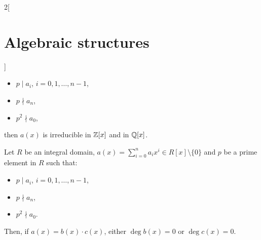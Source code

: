 \documentclass[../../../main_math.tex]{subfiles}
\begin{document}
\begin{multicols}{2}[\section{Algebraic structures}]
\begin{theorem}
    \begin{itemize}
      \item $p\mid a_i$, $i=0,1,\ldots,n-1$,
      \item $p\nmid a_n$,
      \item $p^2\nmid a_0$,
    \end{itemize}
    then $a(x)$ is irreducible in $\mathbb{Z}[x]$ and in $\mathbb{Q}[x]$.
  \end{theorem}
  \begin{theorem}
    Let $R$ be an integral domain, $a(x)=\sum_{i=0}^na_ix^i\in R[x]\setminus\{0\}$ and $p$ be a prime element in $R$ such that:
    \begin{itemize}
      \item $p\mid a_i$, $i=0,1,\ldots,n-1$,
      \item $p\nmid a_n$,
      \item $p^2\nmid a_0$.
    \end{itemize}
    Then, if $a(x)=b(x)\cdot c(x)$, either $\deg b(x)=0$ or $\deg c(x)=0$.
  \end{theorem}

\end{multicols}
\end{document}
